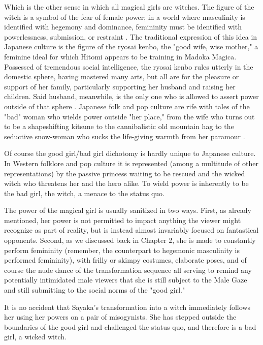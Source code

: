 Which is the other sense in which all magical girls are witches. The figure of the witch is a symbol of the fear of female power; in a world where masculinity is identified with hegemony and dominance, femininity must be identified with powerlessness, submission, or restraint \cite{ref62}. The traditional expression of this idea in Japanese culture is the figure of the ryosai kenbo, the "good wife, wise mother," a feminine ideal for which Hitomi appears to be training in Madoka Magica. Possessed of tremendous social intelligence, the ryosai kenbo rules utterly in the domestic sphere, having mastered many arts, but all are for the pleasure or support of her family, particularly supporting her husband and raising her children. Said husband, meanwhile, is the only one who is allowed to assert power outside of that sphere \cite{ref63}. Japanese folk and pop culture are rife with tales of the "bad" woman who wields power outside "her place," from the wife who turns out to be a shapeshifting kitsune \cite{ref64} to the cannibalistic old mountain hag \cite{ref65} to the seductive snow-woman who sucks the life-giving warmth from her paramour \cite{ref66}. 

Of course the good girl/bad girl dichotomy is hardly unique to Japanese culture. In Western folklore and pop culture it is represented (among a multitude of other representations) by the passive princess waiting to be rescued and the wicked witch who threatens her and the hero alike. To wield power is inherently to be the bad girl, the witch, a menace to the status quo. \cite{ref67} 

The power of the magical girl is usually sanitized in two ways. First, as already mentioned, her power is not permitted to impact anything the viewer might recognize as part of reality, but is instead almost invariably focused on fantastical opponents. Second, as we discussed back in Chapter 2, she is made to constantly perform femininity (remember, the counterpart to hegemonic masculinity is performed femininity), with frilly or skimpy costumes, elaborate poses, and of course the nude dance of the transformation sequence all serving to remind any potentially intimidated male viewers that she is still subject to the Male Gaze and still submitting to the social norms of the "good girl."

It is no accident that Sayaka's transformation into a witch immediately follows her using her powers on a pair of misogynists. She has stepped outside the boundaries of the good girl and challenged the status quo, and therefore is a bad girl, a wicked witch.

